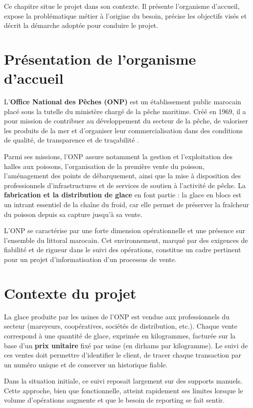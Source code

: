 Ce chapitre situe le projet dans son contexte. Il présente l'organisme d'accueil, expose la problématique métier à l'origine du besoin, précise les objectifs visés et décrit la démarche adoptée pour conduire le projet.

\section{Présentation de l'organisme d'accueil}

L'\textbf{Office National des Pêches (ONP)} est un établissement public marocain placé sous la tutelle du ministère chargé de la pêche maritime. Créé en 1969, il a pour mission de contribuer au développement du secteur de la pêche, de valoriser les produits de la mer et d'organiser leur commercialisation dans des conditions de qualité, de transparence et de traçabilité \cite{onp-site}.

Parmi ses missions, l'ONP assure notamment la gestion et l'exploitation des halles aux poissons, l'organisation de la première vente du poisson, l'aménagement des points de débarquement, ainsi que la mise à disposition des professionnels d'infrastructures et de services de soutien à l'activité de pêche. La \textbf{fabrication et la distribution de glace} en font partie : la glace en blocs est un intrant essentiel de la chaîne du froid, car elle permet de préserver la fraîcheur du poisson depuis sa capture jusqu'à sa vente.

L'ONP se caractérise par une forte dimension opérationnelle et une présence sur l'ensemble du littoral marocain. Cet environnement, marqué par des exigences de fiabilité et de rigueur dans le suivi des opérations, constitue un cadre pertinent pour un projet d'informatisation d'un processus de vente.

\section{Contexte du projet}

La glace produite par les usines de l'ONP est vendue aux professionnels du secteur (mareyeurs, coopératives, sociétés de distribution, etc.). Chaque vente correspond à une quantité de glace, exprimée en kilogrammes, facturée sur la base d'un \textbf{prix unitaire} fixé par usine (en dirhams par kilogramme). Le suivi de ces ventes doit permettre d'identifier le client, de tracer chaque transaction par un numéro unique et de conserver un historique fiable.

Dans la situation initiale, ce suivi reposait largement sur des supports manuels. Cette approche, bien que fonctionnelle, atteint rapidement ses limites lorsque le volume d'opérations augmente et que le besoin de reporting se fait sentir.

